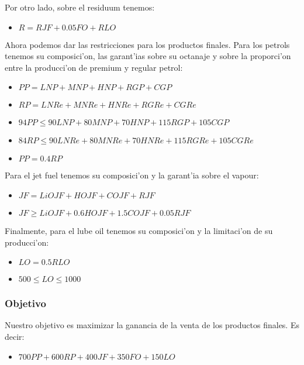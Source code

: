Por otro lado, sobre el residuum tenemos:
\begin{itemize}
\item$R = RJF + 0.05FO + RLO$
\end{itemize}
Ahora podemos dar las restricciones para los productos finales. Para los petrols tenemos su composici'on, las garant'ias sobre su octanaje y sobre la proporci'on entre la producci'on de premium y regular petrol:
\begin{itemize}
\item$PP = LNP + MNP + HNP + RGP + CGP$
\item$RP = LNRe + MNRe + HNRe + RGRe + CGRe$
\item$94PP \leq 90LNP + 80MNP + 70HNP + 115RGP + 105CGP$
\item$84RP \leq 90LNRe + 80MNRe + 70HNRe + 115RGRe + 105CGRe$
\item$PP = 0.4RP$
\end{itemize}
Para el jet fuel tenemos su composici'on y la garant'ia sobre el vapour:
\begin{itemize}
\item$JF = LiOJF + HOJF + COJF + RJF$
\item$JF \geq LiOJF + 0.6HOJF + 1.5COJF + 0.05RJF$
\end{itemize}
Finalmente, para el lube oil tenemos su composici'on y la limitaci'on de su producci'on:
\begin{itemize}
\item$LO = 0.5RLO$
\item$500 \leq LO \leq 1000$
\end{itemize}
\subsubsection{Objetivo}
Nuestro objetivo es maximizar la ganancia de la venta de los productos finales. Es decir:
\begin{itemize}
\item$700PP + 600RP + 400JF + 350FO + 150LO$
\end{itemize}
